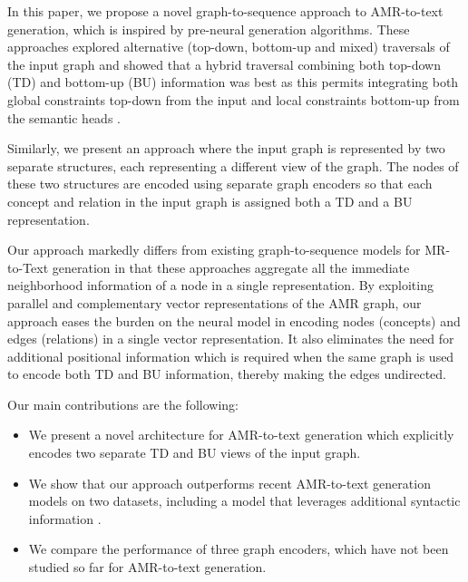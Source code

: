 \documentclass[11pt,a4paper]{article}
\begin{document}
In this paper, we propose a novel graph-to-sequence approach to AMR-to-text generation, which is inspired by pre-neural generation algorithms. These approaches explored alternative (top-down, bottom-up and mixed) traversals of the input graph and showed that a hybrid traversal combining both top-down (TD) and bottom-up (BU) information was best as this permits integrating both global constraints top-down from the input and local constraints bottom-up from the semantic heads \cite{shieber1990semantic,narayan-gardent-2012-structure}.

Similarly, we present an approach where the input graph is represented by two separate structures, each representing a different view of the graph. The nodes of these two structures are encoded using separate graph encoders so that each concept and relation in the input graph is assigned both a TD and a BU representation.

Our approach markedly differs from existing \mbox{graph-to-sequence} models for MR-to-Text generation \cite{marcheggiani-icnl18,beck-etal-2018-acl2018,damonte_naacl18} in that these approaches aggregate all the immediate neighborhood information of a node in a single representation. By exploiting parallel and complementary vector representations of the AMR graph, our approach eases the burden on the neural model in encoding nodes (concepts) and edges (relations) in a single vector representation. It also eliminates the need for additional positional information \cite{beck-etal-2018-acl2018} which is required when the same graph is used to encode both TD and BU information, thereby making the edges undirected.










Our main contributions are the following:
\begin{itemize}
    \item We present a novel architecture for \mbox{AMR-to-text} generation which explicitly encodes two separate TD and BU views of the input graph.
    \item We show that our approach outperforms recent \mbox{AMR-to-text} generation models on two datasets, including a model that leverages additional syntactic information \cite{cao_naacl19}.
    \item We compare the performance of three graph encoders, which have not been studied so far for \mbox{AMR-to-text} generation.
\end{itemize}
\end{document}
